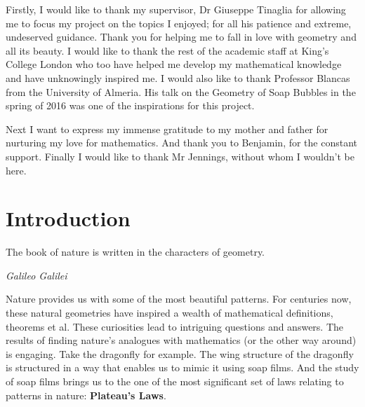 \documentclass[a4paper,12pt]{report}
\begin{document}
Firstly, I would like to thank my supervisor, Dr Giuseppe Tinaglia for allowing me to focus my project on the topics I enjoyed; for all his patience and extreme, undeserved guidance. Thank you for helping me to fall in love with geometry and all its beauty. I would like to thank the rest of the academic staff at King's College London who too have helped me develop my mathematical knowledge and have unknowingly inspired me. I would also like to thank Professor Blancas from the University of Almeria. His talk on the Geometry of Soap Bubbles in the spring of 2016 was one of the inspirations for this project. \newline 

\hspace{-0.66cm}Next I want to express my immense gratitude to my mother and father for nurturing my love for mathematics. And thank you to Benjamin, for the constant support.\newline 
\hspace{-0.66cm}Finally I would like to thank Mr Jennings, without whom I wouldn't be here.


\tableofcontents

\newtheorem{theorem}{Theorem}[chapter]
\newtheorem{corollary}[theorem]{Corollary}
\newtheorem{lemma}[theorem]{Lemma}
\newtheorem{definition}[theorem]{Definition}
\newtheorem{remark}[theorem]{Remark}
\newtheorem{example}[theorem]{Example}
\newtheorem{proposition}[theorem]{Proposition}

\chapter{Introduction}



\epigraph{The book of nature is written in the characters of geometry.}{\textit{Galileo Galilei}}

\hspace{-0.66cm}Nature provides us with some of the most beautiful patterns. For centuries now, these natural geometries have inspired a wealth of mathematical definitions, theorems et al. These curiosities lead to intriguing questions and answers. The results of finding nature's analogues with mathematics (or the other way around) is engaging. Take the dragonfly for example. The wing structure of the dragonfly is structured in a way that enables us to mimic it using soap films. And the study of soap films brings us to the one of the most significant set of laws relating to patterns in nature: \textbf{Plateau's Laws}.
\end{document}
